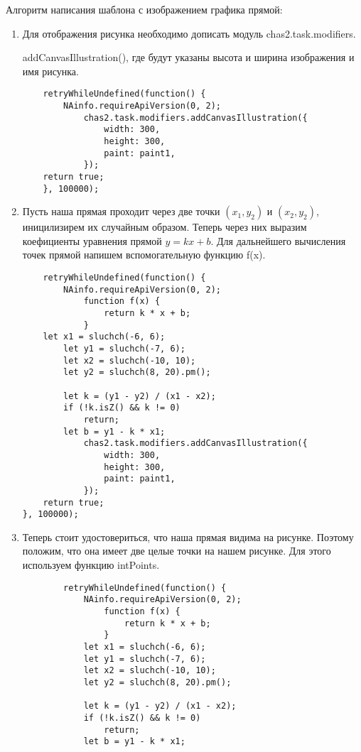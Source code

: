Алгоритм написания шаблона с изображением графика прямой:
\begin{enumerate}
    \item Для отображения рисунка необходимо дописать модуль chas2.task.modifiers.

          addCanvasIllustration(), где будут указаны высота и ширина изображения и имя рисунка.
          \begin{verbatim}
    retryWhileUndefined(function() {
	    NAinfo.requireApiVersion(0, 2);
            chas2.task.modifiers.addCanvasIllustration({
                width: 300,
                height: 300,
                paint: paint1,
            });
    return true;
    }, 100000);
    \end{verbatim}
    \item Пусть наша прямая проходит через две точки $(x_1,y_2)$ и $(x_2,y_2)$, иницилизирем их случайным образом. Теперь через них выразим коефициенты уравнения прямой $y=kx+b$.
          Для дальнейшего вычисления точек прямой напишем вспомогательную функцию f(x).
          \begin{verbatim}
    retryWhileUndefined(function() {
	    NAinfo.requireApiVersion(0, 2);
            function f(x) {
                return k * x + b;
            }
    let x1 = sluchch(-6, 6);
	    let y1 = sluchch(-7, 6);
	    let x2 = sluchch(-10, 10);
	    let y2 = sluchch(8, 20).pm();

	    let k = (y1 - y2) / (x1 - x2);
	    if (!k.isZ() && k != 0)
		    return;
	    let b = y1 - k * x1;
            chas2.task.modifiers.addCanvasIllustration({
                width: 300,
                height: 300,
                paint: paint1,
            });
	return true;
}, 100000);
    \end{verbatim}
    \item Теперь стоит удостовериться, что наша прямая видима на рисунке.
          Поэтому положим, что она имеет две целые точки на нашем рисунке. Для этого используем функцию intPoints.
          \begin{verbatim}
        retryWhileUndefined(function() {
            NAinfo.requireApiVersion(0, 2);
                function f(x) {
                    return k * x + b;
                }
            let x1 = sluchch(-6, 6);
            let y1 = sluchch(-7, 6);
            let x2 = sluchch(-10, 10);
            let y2 = sluchch(8, 20).pm();
    
            let k = (y1 - y2) / (x1 - x2);
            if (!k.isZ() && k != 0)
                return;
            let b = y1 - k * x1;


\end{verbatim}
\end{enumerate}
